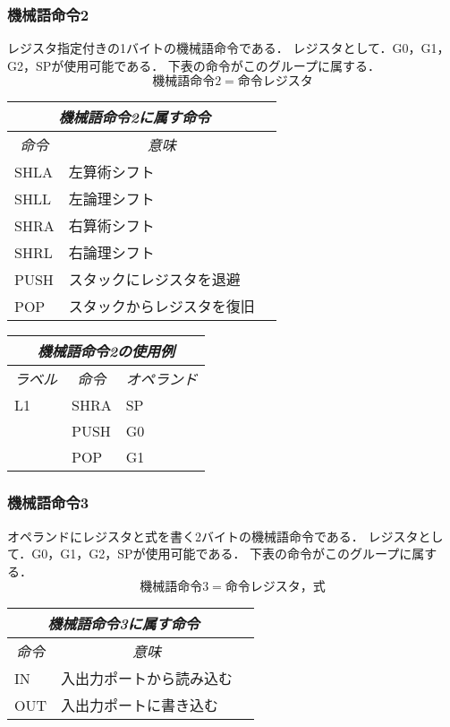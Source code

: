\subsubsection{機械語命令2}
レジスタ指定付きの1バイトの機械語命令である．
レジスタとして．G0，G1，G2，SPが使用可能である．
下表の命令がこのグループに属する．
\[ 機械語命令2 = 命令　レジスタ \]
\begin{center}
\begin{tabular}{lll}
\hline
\multicolumn{2}{c}{\it 機械語命令2に属す命令} \\
\hline
\multicolumn{1}{c}{\it 命令} & \multicolumn{1}{c}{\it 意味} \\
SHLA & 左算術シフト \\
SHLL & 左論理シフト \\
SHRA & 右算術シフト \\
SHRL & 右論理シフト \\
PUSH & スタックにレジスタを退避 \\
POP  & スタックからレジスタを復旧 \\
\hline
\end{tabular}
\end{center}
\vspace{0.2cm}

\begin{center}
\tt\begin{tabular}{lll}
\hline
\multicolumn{3}{c}{\it 機械語命令2の使用例} \\
\hline
\multicolumn{1}{c}{\it ラベル} & 
        \multicolumn{1}{c}{\it 命令} & \multicolumn{1}{c}{\it オペランド} \\
L1  & SHRA &  SP \\
    & PUSH &  G0 \\
    & POP  &  G1 \\
\hline
\end{tabular}
\end{center}
\vspace{0.2cm}

\subsubsection{機械語命令3}
オペランドにレジスタと式を書く2バイトの機械語命令である．
レジスタとして．G0，G1，G2，SPが使用可能である．
下表の命令がこのグループに属する．
\[ 機械語命令3 = 命令　レジスタ，式 \]
\begin{center}
\begin{tabular}{lll}
\hline
\multicolumn{2}{c}{\it 機械語命令3に属す命令} \\
\hline
\multicolumn{1}{c}{\it 命令} & \multicolumn{1}{c}{\it 意味} \\
IN & 入出力ポートから読み込む \\
OUT & 入出力ポートに書き込む \\
\hline
\end{tabular}
\end{center}
\vspace{0.2cm}

